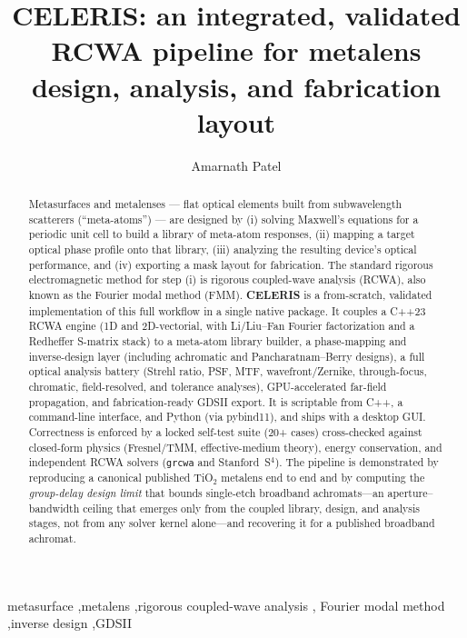 \documentclass[preprint,12pt]{elsarticle}
\begin{document}
\begin{frontmatter}

\title{CELERIS: an integrated, validated RCWA pipeline for metalens
design, analysis, and fabrication layout}

\author[ucf]{Amarnath Patel}

\begin{abstract}
Metasurfaces and metalenses --- flat optical elements built from subwavelength
scatterers (``meta-atoms'') --- are designed by (i) solving Maxwell's equations
for a periodic unit cell to build a library of meta-atom responses, (ii) mapping
a target optical phase profile onto that library, (iii) analyzing the resulting
device's optical performance, and (iv) exporting a mask layout for fabrication.
The standard rigorous electromagnetic method for step (i) is rigorous coupled-wave
analysis (RCWA), also known as the Fourier modal method (FMM). \textbf{CELERIS} is
a from-scratch, validated implementation of this full workflow in a single
native package. It couples a C++23 RCWA engine (1D and 2D-vectorial, with Li/Liu--Fan
Fourier factorization and a Redheffer S-matrix stack) to a meta-atom library builder,
a phase-mapping and inverse-design layer (including achromatic and Pancharatnam--Berry
designs), a full optical analysis battery (Strehl ratio, PSF, MTF, wavefront/Zernike,
through-focus, chromatic, field-resolved, and tolerance analyses), GPU-accelerated
far-field propagation, and fabrication-ready GDSII export. It is scriptable from C++,
a command-line interface, and Python (via pybind11), and ships with a desktop GUI.
Correctness is enforced by a locked self-test suite (20+ cases) cross-checked against
closed-form physics (Fresnel/TMM, effective-medium theory), energy conservation, and
independent RCWA solvers (\texttt{grcwa} and Stanford~S$^4$). The pipeline is
demonstrated by reproducing a canonical published TiO$_2$ metalens end to end and by
computing the \emph{group-delay design limit} that bounds single-etch broadband
achromats---an aperture--bandwidth ceiling that emerges only from the coupled library,
design, and analysis stages, not from any solver kernel alone---and recovering it for a
published broadband achromat.
\end{abstract}

\begin{keyword}
metasurface \sep metalens \sep rigorous coupled-wave analysis \sep
Fourier modal method \sep inverse design \sep GDSII
\end{keyword}

\end{frontmatter}
\end{document}
